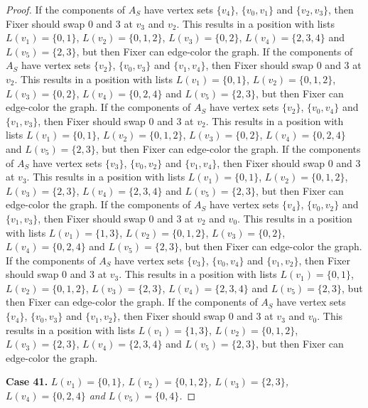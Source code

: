 \documentclass[12pt]{amsart}
\theoremstyle{plain}
\theoremstyle{definition}
\theoremstyle{remark}
\begin{document}
\begin{proof}
If the components of $A_S$ have vertex sets $\{v_4\}$, $\{v_0, v_1\}$ and $\{v_2, v_3\}$, then Fixer should swap 0 and 3 at $v_3$ and $v_2$. This results in a position with lists $L(v_1) = \{0, 1\}$, $L(v_2) = \{0, 1, 2\}$, $L(v_3) = \{0, 2\}$, $L(v_4) = \{2, 3, 4\}$ and $L(v_5) = \{2, 3\}$, but then Fixer can edge-color the graph.
If the components of $A_S$ have vertex sets $\{v_2\}$, $\{v_0, v_3\}$ and $\{v_1, v_4\}$, then Fixer should swap 0 and 3 at $v_2$. This results in a position with lists $L(v_1) = \{0, 1\}$, $L(v_2) = \{0, 1, 2\}$, $L(v_3) = \{0, 2\}$, $L(v_4) = \{0, 2, 4\}$ and $L(v_5) = \{2, 3\}$, but then Fixer can edge-color the graph.
If the components of $A_S$ have vertex sets $\{v_2\}$, $\{v_0, v_4\}$ and $\{v_1, v_3\}$, then Fixer should swap 0 and 3 at $v_2$. This results in a position with lists $L(v_1) = \{0, 1\}$, $L(v_2) = \{0, 1, 2\}$, $L(v_3) = \{0, 2\}$, $L(v_4) = \{0, 2, 4\}$ and $L(v_5) = \{2, 3\}$, but then Fixer can edge-color the graph.
If the components of $A_S$ have vertex sets $\{v_3\}$, $\{v_0, v_2\}$ and $\{v_1, v_4\}$, then Fixer should swap 0 and 3 at $v_3$. This results in a position with lists $L(v_1) = \{0, 1\}$, $L(v_2) = \{0, 1, 2\}$, $L(v_3) = \{2, 3\}$, $L(v_4) = \{2, 3, 4\}$ and $L(v_5) = \{2, 3\}$, but then Fixer can edge-color the graph.
If the components of $A_S$ have vertex sets $\{v_4\}$, $\{v_0, v_2\}$ and $\{v_1, v_3\}$, then Fixer should swap 0 and 3 at $v_2$ and $v_0$. This results in a position with lists $L(v_1) = \{1, 3\}$, $L(v_2) = \{0, 1, 2\}$, $L(v_3) = \{0, 2\}$, $L(v_4) = \{0, 2, 4\}$ and $L(v_5) = \{2, 3\}$, but then Fixer can edge-color the graph.
If the components of $A_S$ have vertex sets $\{v_3\}$, $\{v_0, v_4\}$ and $\{v_1, v_2\}$, then Fixer should swap 0 and 3 at $v_3$. This results in a position with lists $L(v_1) = \{0, 1\}$, $L(v_2) = \{0, 1, 2\}$, $L(v_3) = \{2, 3\}$, $L(v_4) = \{2, 3, 4\}$ and $L(v_5) = \{2, 3\}$, but then Fixer can edge-color the graph.
If the components of $A_S$ have vertex sets $\{v_4\}$, $\{v_0, v_3\}$ and $\{v_1, v_2\}$, then Fixer should swap 0 and 3 at $v_3$ and $v_0$. This results in a position with lists $L(v_1) = \{1, 3\}$, $L(v_2) = \{0, 1, 2\}$, $L(v_3) = \{2, 3\}$, $L(v_4) = \{2, 3, 4\}$ and $L(v_5) = \{2, 3\}$, but then Fixer can edge-color the graph.

\noindent\textbf{Case 41.  }\textit{$L(v_1) = \{0, 1\}$, $L(v_2) = \{0, 1, 2\}$, $L(v_3) = \{2, 3\}$, $L(v_4) = \{0, 2, 4\}$ and $L(v_5) = \{0, 4\}$.}


\end{proof}
\end{document}
